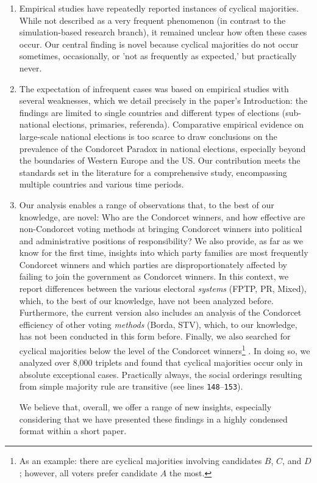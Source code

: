\documentclass[a4paper, 12pt]{scrartcl}
\begin{document}
\begin{enumerate}
	\item Empirical studies have repeatedly reported instances of cyclical majorities. While not described as a very frequent phenomenon (in contrast to the simulation-based research branch), it remained unclear how often these cases occur. Our central finding is novel because cyclical majorities do not occur sometimes, occasionally, or 'not as frequently as expected,' but practically never.
	\item The expectation of infrequent cases was based on empirical studies with several weaknesses, which we detail precisely in the paper's Introduction:  %
    the findings are limited to single countries and different types of elections (sub-national elections, primaries, referenda). Comparative empirical evidence on large-scale national elections is too scarce to draw conclusions on the prevalence of the Condorcet Paradox in national elections, especially beyond the boundaries of Western Europe and the US.  Our contribution meets the standards set in the literature for a comprehensive study, encompassing multiple countries and various time periods.
	\item Our analysis enables a range of observations that, to the best of our knowledge, are novel: Who are the Condorcet winners, and how effective are non-Condorcet voting methods at bringing Condorcet winners into political and administrative positions of responsibility? We also provide, as far as we know for the first time, insights into which party families are most frequently Condorcet winners and which parties are disproportionately affected by failing to join the government as Condorcet winners. In this context, we report differences between the various electoral \emph{systems} (FPTP, PR, Mixed), which, to the best of our knowledge, have not been analyzed before. Furthermore, the current version also includes an analysis of the Condorcet efficiency of other voting \emph{methods} (Borda, STV), which, to our knowledge, has not been conducted in this form before. Finally, we also searched for cyclical majorities below the level of the Condorcet winners\footnote{
	As an example: there are cyclical majorities involving candidates $B$, $C$, and $D$; however, all voters prefer candidate $A$ the most.
} . In doing so, we analyzed over 8,000 triplets and found that cyclical majorities occur only in absolute exceptional cases. Practically always, the social orderings resulting from simple majority rule are transitive (see lines \texttt{148$–$153}).

We believe that, overall, we offer a range of new insights, especially considering that we have presented these findings in a highly condensed format within a short paper.
\end{enumerate}
\end{document}
